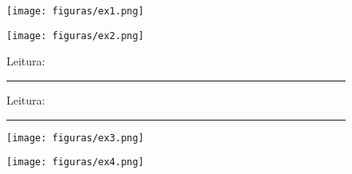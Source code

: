 \begin{figure}[ht]
\label{fig:reg-non}
\centering
\begin{minipage}{\linewidth}
\begin{minipage}{0.4\linewidth}
\texttt{[image: figuras/ex1.png]} 
\end{minipage}
\begin{minipage}{0.4\linewidth}
\texttt{[image: figuras/ex2.png]} 
\end{minipage}

\begin{minipage}{0.4\linewidth}
Leitura:\rule{3cm}{0.4pt}
\end{minipage}
\begin{minipage}{0.4\linewidth}
Leitura:\rule{3cm}{0.4pt}
\end{minipage}

\begin{minipage}{0.4\linewidth}
\texttt{[image: figuras/ex3.png]} 
\end{minipage}
\begin{minipage}{0.4\linewidth}
\texttt{[image: figuras/ex4.png]} 
\end{minipage}
\end{minipage}
\end{figure}

\def\esqnonio{-0.1cm}
\def\largnonio{12*0.19cm}


